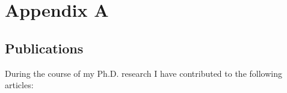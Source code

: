\chapter{Appendix A}
\section*{Publications}

During the course of my Ph.D. research I have contributed to the following articles:

\begin{bibunit}
\nocite{Jordan2008alt}
\nocite{Bishop2009alt}
\nocite{Sipos2011alt}
\nocite{Albers2011alt}
\nocite{LindbladToh2011alt}
\nocite{Jordan2011alt}
\def\chapter*#1{}
\renewcommand{\bibsection}{\chapter*{\bibname}}
\putbib[references]
\end{bibunit}
